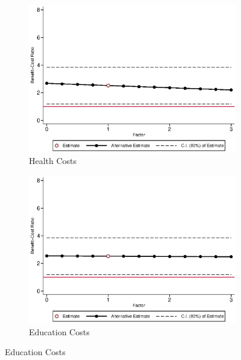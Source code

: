 \begin{figure}[H]
\ContinuedFloat		
	\begin{subfigure}[h]{0.8\textwidth}
	\centering
	\caption{Health Costs} \label{fig:bcrf_health_f1}
	\includegraphics[width=\textwidth]{AppOutput/Sensitivity/bcrf_health_f1.eps}
	\end{subfigure}
	
	\begin{subfigure}[h]{0.8\textwidth}
	\centering
	\caption{Education Costs} \label{fig:bcrf_edu_f1}
	\includegraphics[width=\textwidth]{AppOutput/Sensitivity/bcrf_edu_f1.eps}
	\end{subfigure}
\end{figure}

